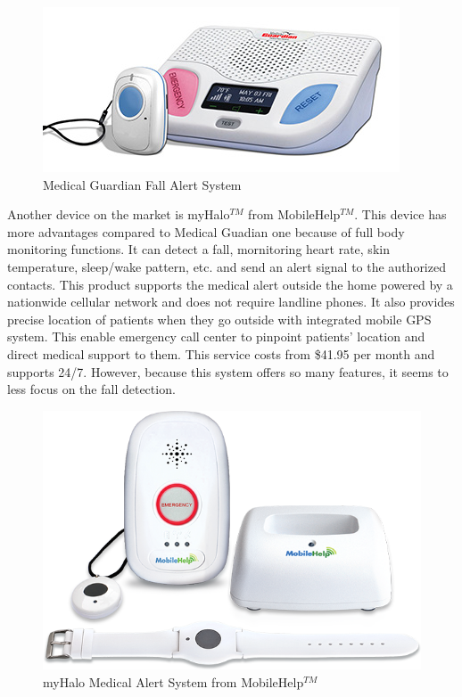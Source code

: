 \documentclass[letterpaper,12pt,titlepage,oneside,final]{book}
\begin{document}
 \begin{figure}[h!]
	\centering
	\includegraphics[scale=0.7]{medical-guardian-fall-alert-system}
	\caption{Medical Guardian Fall Alert System \cite{figure_guardian}}
\end{figure}
  
Another device on the market is myHalo$^{TM}$ from MobileHelp$^{TM}$. This device has more advantages compared to Medical Guadian one because of full body monitoring functions. It can detect a fall, mornitoring heart rate, skin temperature, sleep/wake pattern, etc. and send an alert signal to the authorized contacts. This product supports the medical alert outside the home powered by a nationwide cellular network and does not require landline phones. It also provides precise location of patients when they go outside with integrated mobile GPS system. This enable emergency call center to pinpoint patients' location and direct medical support to them. This service costs from \$41.95 per month and supports 24/7. However, because this system offers so many features, it seems to less focus on the fall detection. 

 \begin{figure}[h!]
	\centering
	\includegraphics[scale=0.5]{mobile-help}
	\caption{myHalo Medical Alert System from MobileHelp$^{TM}$  \cite{myHalo}}
\end{figure}
\end{document}
